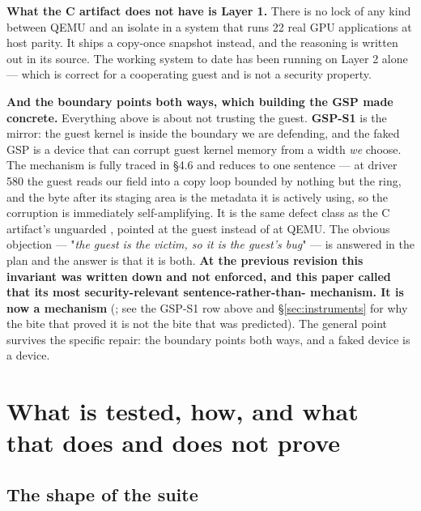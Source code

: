 \documentclass[10.5pt]{article}
\begin{document}
\textbf{What the C artifact does not have is Layer 1.} There is no lock of any kind between QEMU
and an isolate in a system that runs 22 real GPU applications at host parity. It ships a
copy-once snapshot instead, and the reasoning is written out in its source. The working system
to date has been running on Layer 2 alone — which is correct for a cooperating guest and is not
a security property.

\textbf{And the boundary points both ways, which building the GSP made concrete.} Everything
above is about not trusting the guest. \textbf{GSP-S1} is the mirror: the guest kernel is inside
the boundary we are defending, and the faked GSP is a device that can corrupt guest kernel memory
from a width \emph{we} choose. The mechanism is fully traced in
 \S4.6 and reduces to one sentence — at driver 580 the guest reads
our  field into a copy loop bounded by nothing but the ring, and the byte after
its staging area is the  metadata it is actively using, so the corruption is
immediately self-amplifying. It is the same defect class as the C artifact's unguarded
 , pointed at the guest instead of at QEMU. The obvious
objection — "\emph{the guest is the victim, so it is the guest's bug}" — is answered in the plan
and the answer is that it is both. \textbf{At the previous revision this invariant was written
down and not enforced, and this paper called that its most security-relevant sentence-rather-than-
mechanism. It is now a mechanism} (; see the GSP-S1 row above and
\S\ref{sec:instruments} for why the bite that proved it is not the bite that was predicted). The
general point survives the specific repair: the boundary points both ways, and a faked device is
a device.

\section{What is tested, how, and what that does and does not prove}
\label{sec:testing}

\subsection{The shape of the suite}
\end{document}
